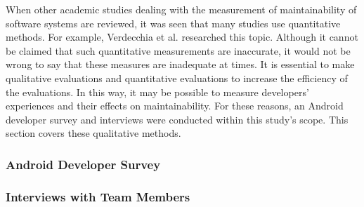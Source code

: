 When other academic studies dealing with the measurement of maintainability of software systems are reviewed, it was seen that many studies use quantitative methods. For example, Verdecchia et al. researched this topic\cite{14}. Although it cannot be claimed that such quantitative measurements are inaccurate, it would not be wrong to say that these measures are inadequate at times. It is essential to make qualitative evaluations and quantitative evaluations to increase the efficiency of the evaluations. In this way, it may be possible to measure developers' experiences and their effects on maintainability. For these reasons, an Android developer survey and interviews were conducted within this study's scope. This section covers these qualitative methods.

\subsubsection{Android Developer Survey}


\subsubsection{Interviews with Team Members}
\label{section:3.1.2}


